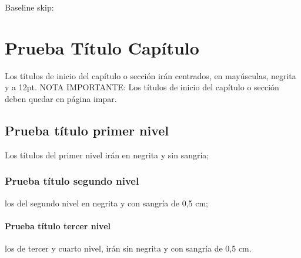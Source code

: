 


Baseline skip:
\the\baselineskip

\chapter{Prueba Título Capítulo}
Los títulos de inicio del capítulo o sección irán centrados, en mayúsculas, negrita y a 12pt. NOTA IMPORTANTE: Los títulos de inicio del capítulo o sección deben quedar en página impar.

\section{Prueba título primer nivel}
Los títulos  del primer nivel irán en negrita y sin sangría;

\subsection{Prueba título segundo nivel}
los del segundo nivel en negrita y con sangría de 0,5 cm;

\subsubsection{Prueba título tercer nivel}
los de tercer y cuarto nivel, irán sin negrita y con sangría de 0,5 cm.
